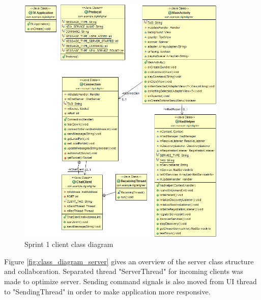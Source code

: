 \begin{figure}[H]
	\centering
		\includegraphics[width=10cm]{sprint1/class_diagram_client.png}
	\caption{Sprint 1 client class diagram}
	\label{fig:class_diagram_client}
\end{figure}

Figure \ref{fig:class_diagram_server} gives an overview of the server class structure and collaboration. Separated thread "ServerThread" for incoming clients was made to optimize server. Sending command signals is also moved from UI thread to "SendingThread" in order to make application more responsive.

